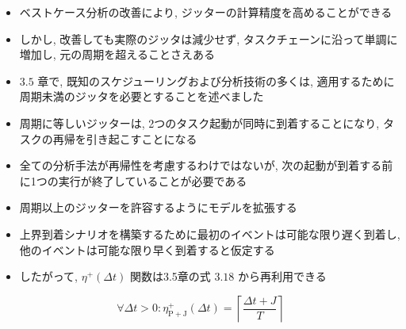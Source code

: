 \begin{frame}{}
\end{frame}

\begin{frame}{}
    \begin{itemize}
        \item ベストケース分析の改善により, ジッターの計算精度を高めることができる
        \item しかし, 改善しても実際のジッタは減少せず, タスクチェーンに沿って単調に増加し, 元の周期を超えることさえある
        \item $3.5$ 章で, 既知のスケジューリングおよび分析技術の多くは, 適用するために周期未満のジッタを必要とすることを述べました
        \item 周期に等しいジッターは, 2つのタスク起動が同時に到着することになり, タスクの再帰を引き起こすことになる
        \item 全ての分析手法が再帰性を考慮するわけではないが, 次の起動が到着する前に1つの実行が終了していることが必要である
    \end{itemize}
\end{frame}

\begin{frame}{}
    \begin{itemize}
        \item 周期以上のジッターを許容するようにモデルを拡張する
        \item 上界到着シナリオを構築するために最初のイベントは可能な限り遅く到着し, 他のイベントは可能な限り早く到着すると仮定する
    \end{itemize}
\end{frame}

\begin{frame}{}
\end{frame}

\begin{frame}{}
    \begin{itemize}
        \item したがって, $\eta^{+}(\Delta t)$ 関数は3.5章の式 $3.18$ から再利用できる

    \end{itemize}
    \begin{equation*}
        \forall \Delta t>0: \eta_{\mathrm{P}+\mathrm{J}}^{+}(\Delta t)=\left\lceil\frac{\Delta t+J}{T}\right\rceil
    \end{equation*}
\end{frame}

